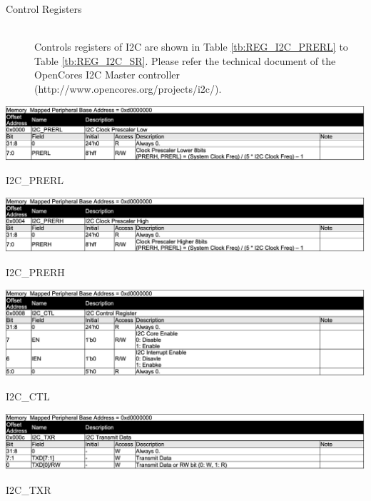 \begin{description}
    \item[Control Registers]\mbox{}\\
        Controls registers of I2C are shown in Table \ref{tb:REG_I2C_PRERL} to Table \ref{tb:REG_I2C_SR}. Please refer the technical document of the OpenCores I2C Master controller (http://www.opencores.org/projects/i2c/).
 
\end{description}

\begin{table}[H]
    \includegraphics[width=1.0\columnwidth]{./Table/REG_I2C_PRERL.png}
    \caption{I2C\_PRERL}
    \label{tb:REG_I2C_PRERL}
\end{table}
\begin{table}[H]
    \includegraphics[width=1.0\columnwidth]{./Table/REG_I2C_PRERH.png}
    \caption{I2C\_PRERH}
    \label{tb:REG_I2C_PRERH}
\end{table}
\begin{table}[H]
    \includegraphics[width=1.0\columnwidth]{./Table/REG_I2C_CTL.png}
    \caption{I2C\_CTL}
    \label{tb:REG_I2C_CTL}
\end{table}
\begin{table}[H]
    \includegraphics[width=1.0\columnwidth]{./Table/REG_I2C_TXR.png}
    \caption{I2C\_TXR}
    \label{tb:REG_I2C_TXR}
\end{table}
